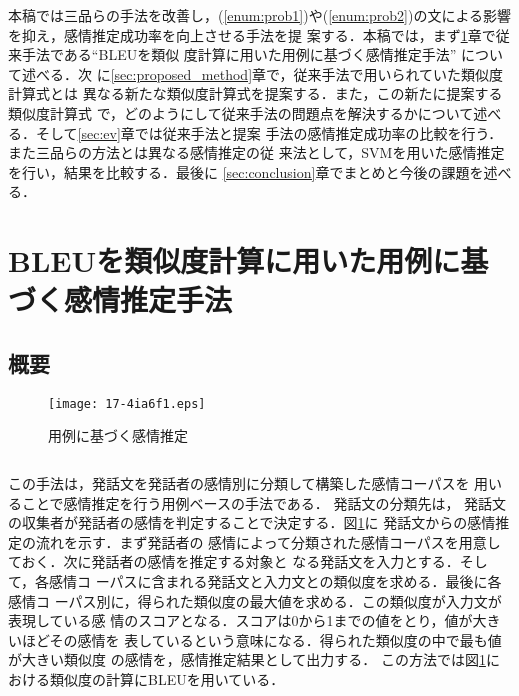 \documentclass[japanese]{jnlp_1.4}
\def\resp#1{}
\def\respeqn#1{}
\newcommand{\argmax}{}
\begin{document}
本稿では三品らの手法を改善し，(\ref{enum:prob1})や(\ref{enum:prob2})の文による影響を抑え，感情推定成功率を向上させる手法を提
案する．本稿では，まず\ref{sec:conventional}章で従来手法である``BLEUを類似
度計算に用いた用例に基づく感情推定手法'' について述べる．次
に\ref{sec:proposed_method}章で，従来手法で用いられていた類似度計算式とは
異なる新たな類似度計算式を提案する．また，この新たに提案する類似度計算式
で，どのようにして従来手法の問題点を解決するかについて述べる．そして\ref{sec:ev}章では従来手法と提案
手法の感情推定成功率の比較を行う．また三品らの方法とは異なる感情推定の従
来法として，SVMを用いた感情推定を行い，結果を比較する．最後に
\ref{sec:conclusion}章でまとめと今後の課題を述べる．





\section{BLEUを類似度計算に用いた用例に基づく感情推定手法}
\label{sec:conventional}

\subsection{概要}

\begin{figure}[b]
 \begin{center}
  \texttt{[image: 17-4ia6f1.eps]}
 \end{center}
 \caption{用例に基づく感情推定}
 \label{fig:estimation}
\end{figure}

\resp{三品らによって提案された類似度計算を用いた用例に基づく
感情推定アルゴリズムは次の式で定式化される．}
\pagebreak
\begin{equation}
\respeqn{E(x) = \argmax_{e} sim(x, s) \hspace{1em} (s \in C_{e})}
\end{equation}
\resp{ここで{$x$}を入力文，{$E(x)$}を推定結果となる感情，{$C_{e}$}を感情{$e$}の
コーパス，{$s$}を{$C_{e}$}に含まれる文，
{$sim(x, s)$}を{$x$}と{$s$}の類似度を返す
関数とする．三品らは{$sim(\cdot)$}にBLEU{\cite{bleu}}を用いている．}
この手法は，発話文を発話者の感情別に分類して構築した感情コーパスを
用いることで感情推定を行う用例ベースの手法である．
発話文の分類先は，
発話文の収集者が発話者の感情を判定することで決定する．図\ref{fig:estimation}に
発話文からの感情推定の流れを示す．まず発話者の
感情によって分類された感情コーパスを用意しておく．次に発話者の感情を推定する対象と
なる発話文を入力とする．そして，各感情コ
ーパスに含まれる発話文と入力文との類似度を求める．最後に各感情コ
ーパス別に，得られた類似度の最大値を求める．この類似度が入力文が表現している感
情のスコアとなる．スコアは0から1までの値をとり，値が大きいほどその感情を
表しているという意味になる．得られた類似度の中で最も値が大きい類似度
の感情を，感情推定結果として出力する．
この方法では図\ref{fig:estimation}における類似度の計算にBLEUを用いている．
\end{document}

